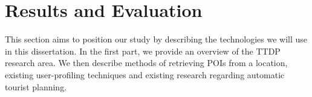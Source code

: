 
\section{Results and Evaluation}

This section aims to position our study by describing the technologies we will
use in this dissertation. In the first part, we provide an
overview of the TTDP research area. We then describe
methods of retrieving POIs from a location, existing
user-profiling techniques and existing research
regarding automatic tourist planning.


